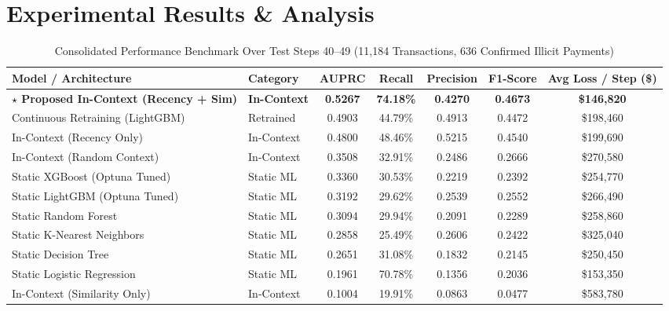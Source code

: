 \documentclass[conference]{IEEEtran}
\begin{document}
\section{Experimental Results \& Analysis}

\begin{table}[t]
\centering
\caption{Consolidated Performance Benchmark Over Test Steps 40--49 (11,184 Transactions, 636 Confirmed Illicit Payments)}
\label{tab:results}
\begin{tabular}{llccccc}
\toprule
\textbf{Model / Architecture} & \textbf{Category} & \textbf{AUPRC} & \textbf{Recall} & \textbf{Precision} & \textbf{F1-Score} & \textbf{Avg Loss / Step (\$)} \\
\midrule
\textbf{$\star$ Proposed In-Context (Recency + Sim)} & \textbf{In-Context} & \textbf{0.5267} & \textbf{74.18\%} & \textbf{0.4270} & \textbf{0.4673} & \textbf{\$146,820} \\
Continuous Retraining (LightGBM) & Retrained & 0.4903 & 44.79\% & 0.4913 & 0.4472 & \$198,460 \\
In-Context (Recency Only) & In-Context & 0.4800 & 48.46\% & 0.5215 & 0.4540 & \$199,690 \\
In-Context (Random Context) & In-Context & 0.3508 & 32.91\% & 0.2486 & 0.2666 & \$270,580 \\
Static XGBoost (Optuna Tuned) & Static ML & 0.3360 & 30.53\% & 0.2219 & 0.2392 & \$254,770 \\
Static LightGBM (Optuna Tuned) & Static ML & 0.3192 & 29.62\% & 0.2539 & 0.2552 & \$266,490 \\
Static Random Forest & Static ML & 0.3094 & 29.94\% & 0.2091 & 0.2289 & \$258,860 \\
Static K-Nearest Neighbors & Static ML & 0.2858 & 25.49\% & 0.2606 & 0.2422 & \$325,040 \\
Static Decision Tree & Static ML & 0.2651 & 31.08\% & 0.1832 & 0.2145 & \$250,450 \\
Static Logistic Regression & Static ML & 0.1961 & 70.78\% & 0.1356 & 0.2036 & \$153,350 \\
In-Context (Similarity Only) & In-Context & 0.1004 & 19.91\% & 0.0863 & 0.0477 & \$583,780 \\
\bottomrule
\end{tabular}
\end{table}
\end{document}
